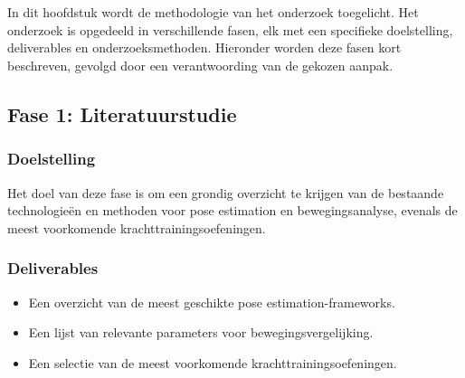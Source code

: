 
\chapter{}%
\label{ch:methodologie}


In dit hoofdstuk wordt de methodologie van het onderzoek toegelicht. Het onderzoek is opgedeeld in verschillende fasen, elk met een specifieke doelstelling, deliverables en onderzoeksmethoden. Hieronder worden deze fasen kort beschreven, gevolgd door een verantwoording van de gekozen aanpak.

\section{Fase 1: Literatuurstudie}
\subsection{Doelstelling}
Het doel van deze fase is om een grondig overzicht te krijgen van de bestaande technologieën en methoden voor pose estimation en bewegingsanalyse, evenals de meest voorkomende krachttrainingsoefeningen.  

\subsection{Deliverables}
\begin{itemize}
    \item Een overzicht van de meest geschikte pose estimation-frameworks.
    \item Een lijst van relevante parameters voor bewegingsvergelijking.
    \item Een selectie van de meest voorkomende krachttrainingsoefeningen.
\end{itemize}

